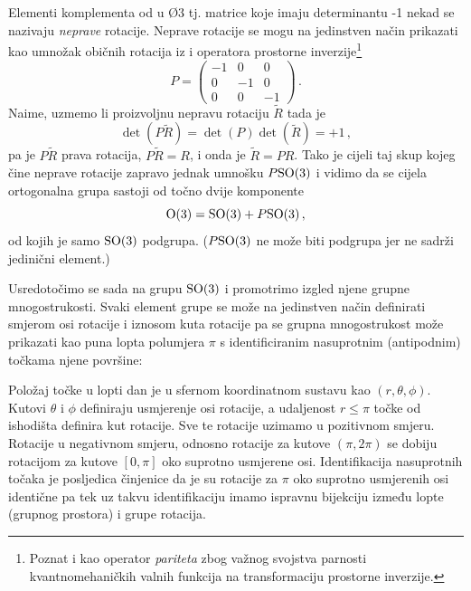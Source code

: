 Elementi komplementa od  u \O{3} tj. matrice koje imaju determinantu -1 nekad se 
nazivaju \emph{neprave} rotacije. 
Neprave rotacije se mogu na jedinstven
način prikazati kao umnožak običnih rotacija iz  i operatora 
  
prostorne inverzije\footnote{Poznat i kao operator \emph{pariteta} zbog
    važnog svojstva parnosti kvantnomehaničkih valnih funkcija na transformaciju
prostorne inverzije.}
\begin{equation}
P = \begin{pmatrix}
-1 & 0 & 0 \\ 
0  &-1 & 0 \\
0  & 0 & -1
\end{pmatrix} \,.
\end{equation}
Naime, uzmemo li proizvoljnu nepravu rotaciju $\tilde{R}$ tada
je 
\begin{equation}
\det (P \tilde{R}) = \det(P) \det(\tilde{R}) = +1      \,,
\end{equation}
pa je $P\tilde{R}$ 
prava rotacija, $P\tilde{R} = R$,
i onda je $\tilde{R} = P R$. Tako je cijeli taj skup
kojeg čine neprave rotacije zapravo jednak umnošku $P\mathrm{SO}(3)$ i vidimo da
se cijela ortogonalna grupa sastoji od točno dvije komponente
\begin{equation}
    \mathrm{O}(3) = \mathrm{SO}(3) + P\mathrm{SO}(3)\,,
    \label{eq:so3Pso3}
\end{equation}
od kojih je samo $\mathrm{SO}(3)$ podgrupa. ($P\mathrm{SO}(3)$ ne može biti podgrupa jer ne sadrži
jedinični element.)

Usredotočimo se sada na grupu $\mathrm{SO}(3)$ i promotrimo izgled njene grupne mnogostrukosti.
Svaki element grupe  se može na jedinstven način definirati
smjerom osi rotacije i iznosom kuta rotacije pa se grupna mnogostrukost
može prikazati kao puna lopta polumjera $\pi$ s identificiranim nasuprotnim
(antipodnim) točkama njene površine:

\centerline{}

Položaj točke u lopti dan je u sfernom koordinatnom sustavu kao
$(r, \theta, \phi)$. Kutovi $\theta$ i $\phi$ definiraju usmjerenje
osi rotacije, a udaljenost $r \le \pi$ točke od ishodišta definira kut rotacije.
Sve te rotacije uzimamo u pozitivnom smjeru. Rotacije u negativnom smjeru,
odnosno rotacije za 
kutove $(\pi, 2\pi)$ se dobiju rotacijom za kutove $[0, \pi]$ oko
suprotno usmjerene osi. Identifikacija nasuprotnih točaka je posljedica
činjenice da je su rotacije za $\pi$ oko suprotno usmjerenih osi
identične pa tek uz takvu identifikaciju imamo ispravnu bijekciju
između lopte (grupnog prostora) i  grupe rotacija. 

